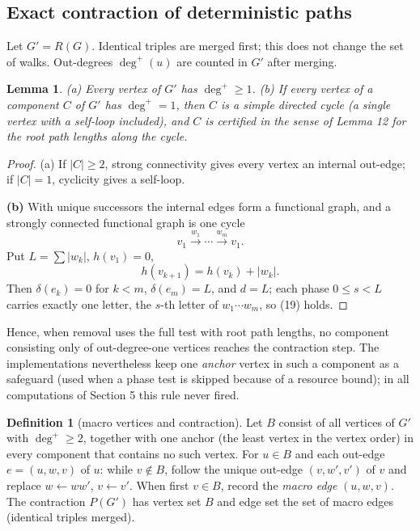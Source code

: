 \documentclass[11pt,reqno]{amsart}
\newtheorem{lemma}[theorem]{Lemma}
\theoremstyle{definition}
\newtheorem*{definition}{Definition}
\theoremstyle{remark}
\begin{document}
\subsection{Exact contraction of deterministic paths}\label{sec:4.3}

Let \(G'=R(G)\). Identical triples are merged first; this does not change
the set of walks. Out-degrees \(\deg^+(u)\) are counted in \(G'\) after
merging.

\begin{samepage}
\begin{lemma}\leavevmode\label{thm:14}
(a) Every vertex of \(G'\) has \(\deg^+\ge1\). (b) If every
vertex of a component \(C\) of \(G'\) has \(\deg^+=1\), then \(C\) is a
simple directed cycle (a single vertex with a self-loop included), and
\(C\) is certified in the sense of Lemma 12 for the root path lengths
along the cycle.
\label{thm-end:14}
\end{lemma}
\end{samepage}

\begin{proof}\leavevmode\label{proof:14}
(a) If \(|C|\ge2\), strong connectivity gives every vertex an
internal out-edge; if \(|C|=1\), cyclicity gives a self-loop.

\textbf{(b)} With
unique successors the internal edges form a functional graph, and a
strongly connected functional graph is one cycle
\[
v_1\xrightarrow{w_1}\cdots\xrightarrow{w_m}v_1.
\]
Put \(L=\sum|w_k|\),
\(h(v_1)=0\),
\[
h(v_{k+1})=h(v_k)+|w_k|.
\]
Then \(\delta(e_k)=0\) for
\(k<m\), \(\delta(e_m)=L\), and \(d=L\); each phase \(0\le s<L\) carries
exactly one letter, the \(s\)-th letter of \(w_1\cdots w_m\), so (19)
holds. \qedhere
\end{proof}

Hence, when removal uses the full test with root path lengths, no
component consisting only of out-degree-one vertices reaches the
contraction step. The implementations
nevertheless keep one \emph{anchor} vertex in such a component as a safeguard
(used when a phase test is skipped because of a resource bound); in all
computations of Section 5 this rule never fired.

\begin{definition}[macro vertices and contraction]
Let \(B\) consist of
all vertices of \(G'\) with \(\deg^+\ge2\), together with one anchor (the
least vertex in the vertex order) in every component that contains no such
vertex. For \(u\in B\) and each out-edge \(e=(u,w,v)\) of \(u\): while
\(v\notin B\), follow the unique out-edge \((v,w',v')\) of \(v\) and
replace \(w\leftarrow ww'\), \(v\leftarrow v'\). When first \(v\in B\),
record the \emph{macro edge} \((u,w,v)\). The contraction \(P(G')\) has vertex
set \(B\) and edge set the set of macro edges (identical triples merged).
\end{definition}
\end{document}
